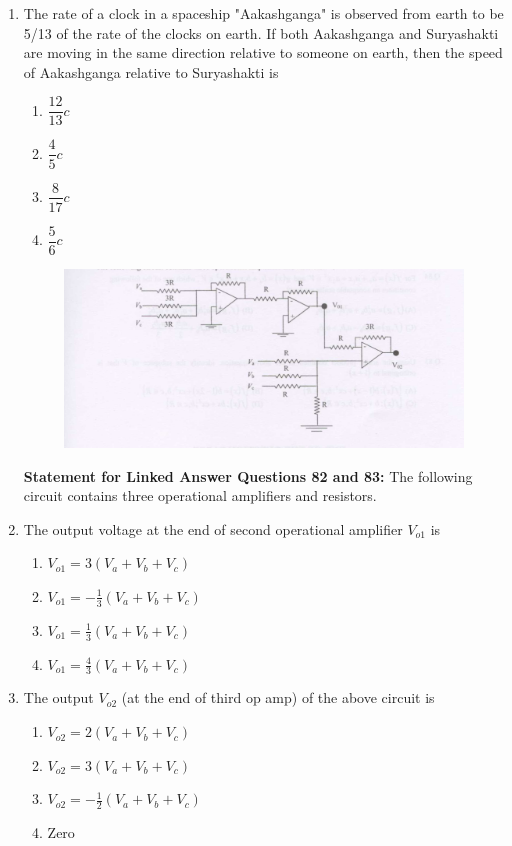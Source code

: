 \documentclass[journal,12pt,onecolumn]{IEEEtran}
\theoremstyle{remark}
\begin{document}
\begin{enumerate}
\item The rate of a clock in a spaceship "Aakashganga" is observed from earth to be 5/13 of the rate of the clocks on earth. If both Aakashganga and Suryashakti are moving in the same direction relative to someone on earth, then the speed of Aakashganga relative to Suryashakti is
\hfill{}
\begin{multicols}{4}
\begin{enumerate}
    \item $\dfrac{12}{13}c$
    \item $\dfrac{4}{5}c$
    \item $\dfrac{8}{17}c$
    \item $\dfrac{5}{6}c$
\end{enumerate}
\end{multicols}
\begin{figure}[H]
    \centering
    \includegraphics[width = 0.6\columnwidth]{fig/Q82 to Q83.png}
    \caption*{}
    \label{fig:Q82 to Q83}
    \end{figure}
\vspace{0.5 mm}
\textbf{Statement for Linked Answer Questions 82 and 83:} 
The following circuit contains three operational amplifiers and resistors.
\vspace{0.25 mm}

\item The output voltage at the end of second operational amplifier $V_{o1}$ is
\hfill{}
\begin{multicols}{2}
\begin{enumerate}
    \item $V_{o1}=3(V_a+V_b+V_c)$
    \item $V_{o1}=-\tfrac{1}{3}(V_a+V_b+V_c)$
    \item $V_{o1}=\tfrac{1}{3}(V_a+V_b+V_c)$
    \item $V_{o1}=\tfrac{4}{3}(V_a+V_b+V_c)$
\end{enumerate}
\end{multicols}

\item The output $V_{o2}$ (at the end of third op amp) of the above circuit is
\hfill{}
\begin{multicols}{2}
\begin{enumerate}
    \item $V_{o2}=2(V_a+V_b+V_c)$
    \item $V_{o2}=3(V_a+V_b+V_c)$
    \item $V_{o2}=-\tfrac{1}{2}(V_a+V_b+V_c)$
    \item Zero
\end{enumerate}
\end{multicols}


\end{enumerate}
\end{document}
